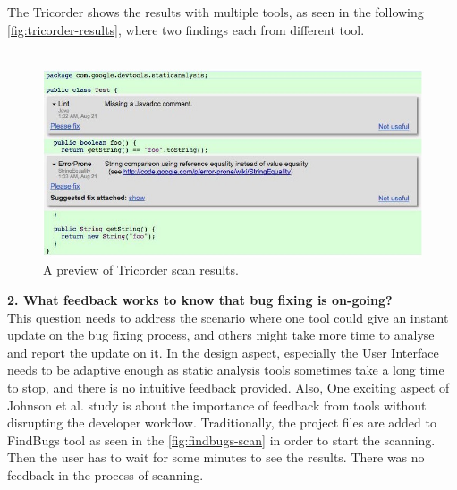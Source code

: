 The Tricorder shows the results with multiple tools, as seen in the following \autoref{fig:tricorder-results}, where two findings each from different tool. \\ \\

\begin{figure}[hbt!]
	\centering
	\includegraphics[width=\linewidth]{figures/Tricorder}
	\caption{A preview of Tricorder scan results. \cite{tricorder}}
	\label{fig:tricorder-results}
\end{figure}

\textbf{2. What feedback works to know that bug fixing is on-going?} \\

This question needs to address the scenario where one tool could give an instant update on the bug fixing process, and others might take more time to analyse and report the update on it. In the design aspect, especially the User Interface needs to be adaptive \cite{NB18} enough as static analysis tools sometimes take a long time to stop, and there is no intuitive feedback provided. Also, One exciting aspect of Johnson et al. \cite{JSMB13} study is about the importance of feedback from tools without disrupting the developer workflow. Traditionally, the project files are added to FindBugs \cite{findbugs} tool as seen in the \autoref{fig:findbugs-scan} in order to start the scanning. Then the user has to wait for some minutes to see the results. There was no feedback in the process of scanning. \\ \\


